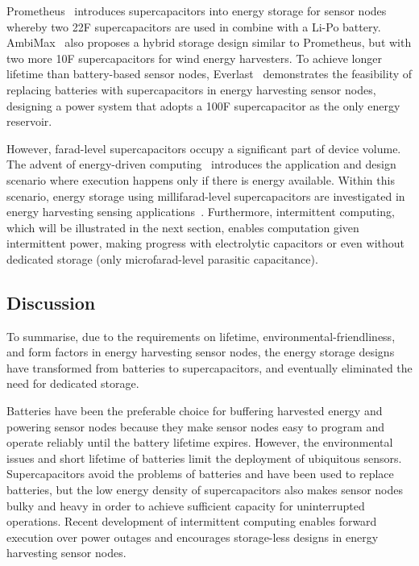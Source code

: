 Prometheus~\cite{jiang2005perpetual} introduces supercapacitors into energy storage for sensor nodes whereby two 22F supercapacitors are used in combine with a Li-Po battery. AmbiMax~\cite{park2006ambimax} also proposes a hybrid storage design similar to Prometheus, but with two more 10F supercapacitors for wind energy harvesters. To achieve longer lifetime than battery-based sensor nodes, Everlast~\cite{simjee2006everlast} demonstrates the feasibility of replacing batteries with supercapacitors in energy harvesting sensor nodes, designing a power system that adopts a 100F supercapacitor as the only energy reservoir. 

However, farad-level supercapacitors occupy a significant part of device volume. The advent of energy-driven computing~\cite{merrett2017energy} introduces the application and design scenario where execution happens only if there is energy available. Within this scenario, energy storage using millifarad-level supercapacitors are investigated in energy harvesting sensing applications~\cite{naderiparizi2015wispcam, gomez2016dynamic}. Furthermore, intermittent computing, which will be illustrated in the next section, enables computation given intermittent power, making progress with electrolytic capacitors or even without dedicated storage (only microfarad-level parasitic capacitance).

\subsection{Discussion}

To summarise, due to the requirements on lifetime, environmental-friendliness, and form factors in energy harvesting sensor nodes, the energy storage designs have transformed from batteries to supercapacitors, and eventually eliminated the need for dedicated storage. 

Batteries have been the preferable choice for buffering harvested energy and powering sensor nodes because they make sensor nodes easy to program and operate reliably until the battery lifetime expires. However, the environmental issues and short lifetime of batteries limit the deployment of ubiquitous sensors. Supercapacitors avoid the problems of batteries and have been used to replace batteries, but the low energy density of supercapacitors also makes sensor nodes bulky and heavy in order to achieve sufficient capacity for uninterrupted operations. Recent development of intermittent computing enables forward execution over power outages and encourages storage-less designs in energy harvesting sensor nodes.

